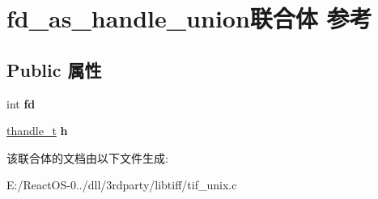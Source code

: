 \hypertarget{unionfd__as__handle__union}{}\section{fd\+\_\+as\+\_\+handle\+\_\+union联合体 参考}
\label{unionfd__as__handle__union}
\subsection*{Public 属性}
\begin{DoxyCompactItemize}
\item 
\mbox{\label{unionfd__as__handle__union_a3891edb291312fc25d3418ca5bb1dbc5}} 
int {\bfseries fd}
\item 
\mbox{\label{unionfd__as__handle__union_a164f213a0d8fb04277064a09eaf902cc}} 
\hyperlink{interfacevoid}{thandle\+\_\+t} {\bfseries h}
\end{DoxyCompactItemize}


该联合体的文档由以下文件生成\+:\begin{DoxyCompactItemize}
\item 
E\+:/\+React\+O\+S-\/0../dll/3rdparty/libtiff/tif\+\_\+unix.\+c\end{DoxyCompactItemize}
